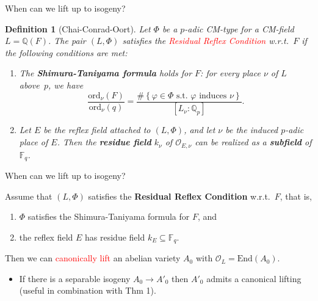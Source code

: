 \documentclass[usenames,dvipsnames,handout]{beamer}
\def\Q{\mathbb{Q}}
\def\F{\mathbb{F}}
\newcommand{\cO}{{\mathcal O}}
\newcommand{\vphi}{\varphi}
\newcommand{\set}[1]{\left\lbrace#1\right\rbrace }
\newcommand{\red}[1]{\textcolor{red}{#1}}
\newtheorem{df}{Definition}[section]
\begin{document}
\begin{frame}[noframenumbering]{ When can we lift up to isogeny? }
	\begin{df}[Chai-Conrad-Oort]
		Let $\Phi$ be a $p$-adic CM-type for a CM-field $L=\Q(F)$.
		\pause The pair $(L,\Phi)$ satisfies the \red{Residual Reflex Condition} w.r.t.~$F$ 
		if the following conditions are met:
		\begin{enumerate}[1.]
			\pause \item \label{def:RRC_item_st} The {\bf Shimura-Taniyama formula} holds for $F$: for every  place $\nu$ of $L$ above~$p$, we have
			\begin{equation*}
			\dfrac{ \mathrm{ord}_\nu(F)}{ \mathrm{ord}_\nu(q)}=\dfrac{\#\set{ \vphi \in \Phi \text{ s.t.~} \vphi \text{ induces } \nu }}{[L_\nu:\Q_p]}.
			\end{equation*}
			\pause \item \label{def:RRC_item_refl} Let $E$ be the reflex field attached to $(L,\Phi)$, and let $\nu$ be the induced $p$-adic place of $E$. Then the {\bf residue field} $k_\nu$ of $\cO_{E,\nu}$
			can be realized as a {\bf subfield} of $\F_q$.
		\end{enumerate}
	\end{df}
\end{frame}

\begin{frame}[noframenumbering]{ When can we lift up to isogeny?  }
	\begin{theorem}
    Assume that $(L,\Phi)$ satisfies the {\bf Residual Reflex Condition} w.r.t.~$F$, that is,\\
    \begin{enumerate}
    \item $\Phi$ satisfies the {Shimura-Taniyama} formula for $F$, and
    \item the reflex field $E$ has residue field {$k_E\subseteq \F_q$}.
    \end{enumerate}  
\pause 
    Then we can \red{canonically lift} an abelian variety $A_0$ with $\mathcal{O}_L = \mathrm{End}(A_0)$.
	\end{theorem}
	\begin{itemize}
\pause
    \item If there is a separable isogeny $A_0\to A'_0$ then $A'_0$ admits a canonical lifting (useful in combination with Thm 1).
	\end{itemize}
\end{frame}
\end{document}
